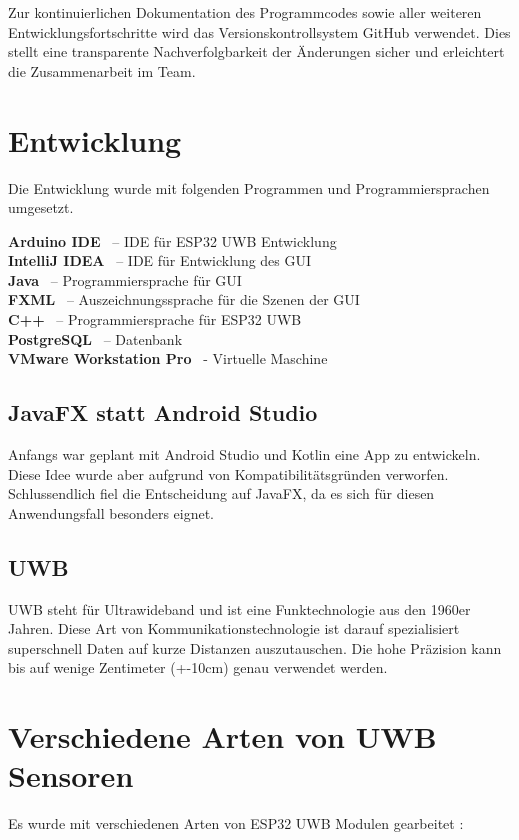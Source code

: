 Zur kontinuierlichen Dokumentation des Programmcodes sowie aller weiteren Entwicklungsfortschritte wird das Versionskontrollsystem GitHub verwendet. Dies stellt eine transparente Nachverfolgbarkeit der Änderungen sicher und erleichtert die Zusammenarbeit im Team.

\section{Entwicklung}
Die Entwicklung wurde mit folgenden Programmen und Programmiersprachen umgesetzt.

\textbf{Arduino IDE} \ – IDE für ESP32 UWB Entwicklung \\
\textbf{IntelliJ IDEA} \ – IDE für Entwicklung des GUI \\
\textbf{Java} \ – Programmiersprache für GUI \\
\textbf{FXML} \ – Auszeichnungssprache für die Szenen der GUI \\
\textbf{C++} \ – Programmiersprache für ESP32 UWB \\
\textbf{PostgreSQL} \ – Datenbank \\
\textbf{VMware Workstation Pro} \ - Virtuelle Maschine

\subsection{JavaFX statt Android Studio}
Anfangs war geplant mit Android Studio und Kotlin eine App zu entwickeln. Diese Idee wurde aber aufgrund von Kompatibilitätsgründen verworfen. Schlussendlich fiel die Entscheidung auf JavaFX, da es sich für diesen Anwendungsfall besonders eignet. 

\subsection{UWB}

UWB steht für Ultrawideband und ist eine Funktechnologie aus den 1960er Jahren. Diese Art von Kommunikationstechnologie ist darauf spezialisiert superschnell Daten auf kurze Distanzen auszutauschen. Die hohe Präzision kann bis auf wenige Zentimeter (+-10cm) genau verwendet werden. \parencite{UWB}

\section{Verschiedene Arten von UWB Sensoren}

Es wurde mit verschiedenen Arten von ESP32 UWB Modulen gearbeitet \parencite{ArtenSensorn}: 

